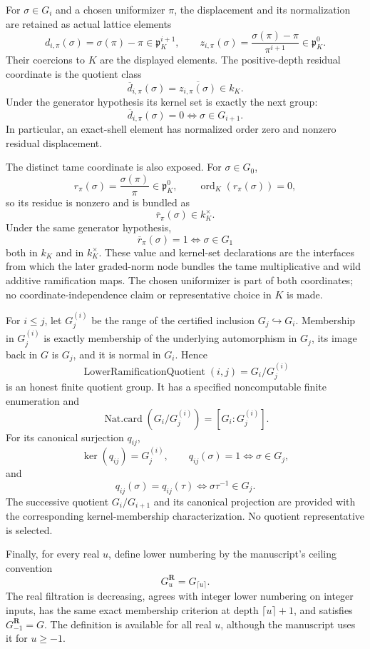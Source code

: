 \begin{definition}
For $\sigma\in G_i$ and a chosen uniformizer $\pi$, the displacement and its
normalization are retained as actual lattice elements
\[
 d_{i,\pi}(\sigma)=\sigma(\pi)-\pi\in\mathfrak p_K^{i+1},
 \qquad
 z_{i,\pi}(\sigma)=
 \frac{\sigma(\pi)-\pi}{\pi^{i+1}}\in\mathfrak p_K^0.
\]
Their coercions to $K$ are the displayed elements.  The positive-depth
residual coordinate is the quotient class
\[
 \overline d_{i,\pi}(\sigma)
 =\overline{z_{i,\pi}(\sigma)}\in k_K.
\]
Under the generator hypothesis its kernel set is exactly the next group:
\[
 \overline d_{i,\pi}(\sigma)=0
 \Longleftrightarrow \sigma\in G_{i+1}.
\]
In particular, an exact-shell element has normalized order zero and nonzero
residual displacement.

The distinct tame coordinate is also exposed.  For $\sigma\in G_0$,
\[
 r_\pi(\sigma)=\frac{\sigma(\pi)}{\pi}\in\mathfrak p_K^0,
 \qquad \operatorname{ord}_K(r_\pi(\sigma))=0,
\]
so its residue is nonzero and is bundled as
\[
 \overline r_\pi(\sigma)\in k_K^\times.
\]
Under the same generator hypothesis,
\[
 \overline r_\pi(\sigma)=1\Longleftrightarrow\sigma\in G_1
\]
both in $k_K$ and in $k_K^\times$.  These value and kernel-set declarations
are the interfaces from which the later graded-norm node bundles the tame
multiplicative and wild additive ramification maps.  The chosen uniformizer is
part of both coordinates; no coordinate-independence claim or representative
choice in $K$ is made.

For $i\leq j$, let $G_j^{(i)}$ be the range of the certified inclusion
$G_j\hookrightarrow G_i$.  Membership in $G_j^{(i)}$ is exactly membership of
the underlying automorphism in $G_j$, its image back in $G$ is $G_j$, and it
is normal in $G_i$.  Hence
\[
 \operatorname{LowerRamificationQuotient}(i,j)=G_i/G_j^{(i)}
\]
is an honest finite quotient group.  It has a specified noncomputable finite
enumeration and
\[
 \operatorname{Nat.card}(G_i/G_j^{(i)})=[G_i:G_j^{(i)}].
\]
For its canonical surjection $q_{ij}$,
\[
 \ker(q_{ij})=G_j^{(i)},\qquad
 q_{ij}(\sigma)=1\Longleftrightarrow\sigma\in G_j,
\]
and
\[
 q_{ij}(\sigma)=q_{ij}(\tau)
 \Longleftrightarrow \sigma\tau^{-1}\in G_j.
\]
The successive quotient $G_i/G_{i+1}$ and its canonical projection are
provided with the corresponding kernel-membership characterization.  No
quotient representative is selected.

Finally, for every real $u$, define lower numbering by the manuscript's
ceiling convention
\[
 G_u^{\mathbf R}=G_{\lceil u\rceil}.
\]
The real filtration is decreasing, agrees with integer lower numbering on
integer inputs, has the same exact membership criterion at depth
$\lceil u\rceil+1$, and satisfies $G_{-1}^{\mathbf R}=G$.  The definition is
available for all real $u$, although the manuscript uses it for $u\geq-1$.


\end{definition}
